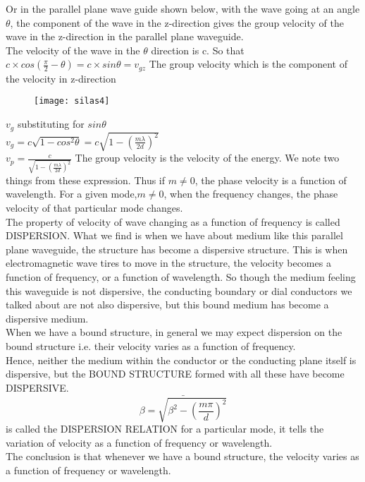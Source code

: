 Or in the parallel plane wave guide shown below, with the wave going at an angle $\theta$, the component of the wave in the z-direction gives the group velocity of the wave in the z-direction in the parallel plane waveguide.\\
The velocity of the wave in the $\theta$ direction is c. So that $c\times cos(\frac{\pi}{2} - \theta)= c\times sin\theta= v_{gz}$
The group velocity which is the component of the velocity in z-direction\\
\begin{figure}[h]
	\centering
	\texttt{[image: silas4]}
	\caption{}
\end{figure}
$v_{g}$ substituting for $sin\theta$\\
$v_{g} =c\sqrt{1-cos^{2}\theta} =c\sqrt{1-(\frac{m\lambda}{2d})^{2}}$\\ 
$v_{p}= \frac{c}{\sqrt{1-(\frac{m\lambda}{2d})^{2}}}$
The group velocity is the velocity of the energy. We note two things from these expression.
Thus if $m \neq 0$, the phase velocity is a function of wavelength. For a given mode,$m \neq 0$, when the frequency changes, the phase velocity of that particular mode changes.\\
The property of velocity of wave changing as a function of frequency is called DISPERSION. What we find is when we have about medium like this parallel plane waveguide, the structure has become a dispersive structure. This is when electromagnetic wave tires to move in the structure, the velocity becomes a function of frequency, or a function of wavelength. So though the medium feeling this waveguide is not dispersive, the conducting boundary or dial conductors we talked about are not also dispersive, but this bound medium has become a dispersive medium.\\ 
When we have a bound structure, in general we may expect dispersion on the bound structure i.e. their velocity varies as a function of frequency.\\
Hence, neither the medium within the conductor or the conducting plane itself is dispersive, but the BOUND STRUCTURE formed with all these have become DISPERSIVE.
\begin{equation}
\bar{\beta = \sqrt{\beta^{2} -(\frac{m\pi}{d})^{2}}}
\end{equation} is called the DISPERSION RELATION for a particular mode, it tells the variation of velocity as a function of frequency or wavelength.\\ The conclusion is that whenever we have a bound structure, the velocity varies as a function of frequency or wavelength.\\
